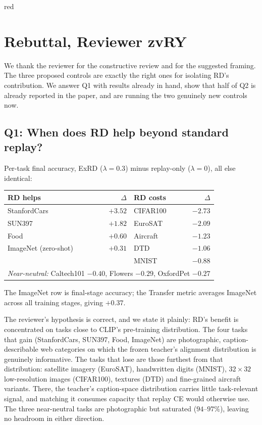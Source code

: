 \documentclass[11pt]{article}
\begin{document}
\begin{color}{red}
\section*{Rebuttal, Reviewer zvRY}

We thank the reviewer for the constructive review and for the suggested framing. The three proposed controls are exactly the right ones for isolating RD's contribution. We answer Q1 with results already in hand, show that half of Q2 is already reported in the paper, and are running the two genuinely new controls now.

\subsection*{Q1: When does RD help beyond standard replay?}

Per-task final accuracy, ExRD ($\lambda{=}0.3$) minus replay-only ($\lambda{=}0$), all else identical:

\begin{table}[h]\centering\small
\begin{tabular}{lr@{\qquad}lr}
\hline
\textbf{RD helps} & $\Delta$ & \textbf{RD costs} & $\Delta$ \\
\hline
StanfordCars & $+3.52$ & CIFAR100 & $-2.73$ \\
SUN397       & $+1.82$ & EuroSAT  & $-2.09$ \\
Food         & $+0.60$ & Aircraft & $-1.23$ \\
ImageNet (zero-shot) & $+0.31$ & DTD & $-1.06$ \\
             &         & MNIST    & $-0.88$ \\
\hline
\multicolumn{4}{l}{\textit{Near-neutral:} Caltech101 $-0.40$, Flowers $-0.29$, OxfordPet $-0.27$} \\
\hline
\end{tabular}
\end{table}

\noindent The ImageNet row is final-stage accuracy; the Transfer metric averages ImageNet across all training stages, giving $+0.37$.

The reviewer's hypothesis is correct, and we state it plainly: RD's benefit is concentrated on tasks close to CLIP's pre-training distribution. The four tasks that gain (StanfordCars, SUN397, Food, ImageNet) are photographic, caption-describable web categories on which the frozen teacher's alignment distribution is genuinely informative. The tasks that lose are those furthest from that distribution: satellite imagery (EuroSAT), handwritten digits (MNIST), $32{\times}32$ low-resolution images (CIFAR100), textures (DTD) and fine-grained aircraft variants. There, the teacher's caption-space distribution carries little task-relevant signal, and matching it consumes capacity that replay CE would otherwise use. The three near-neutral tasks are photographic but saturated ($94$--$97\%$), leaving no headroom in either direction.


\end{color}
\end{document}
